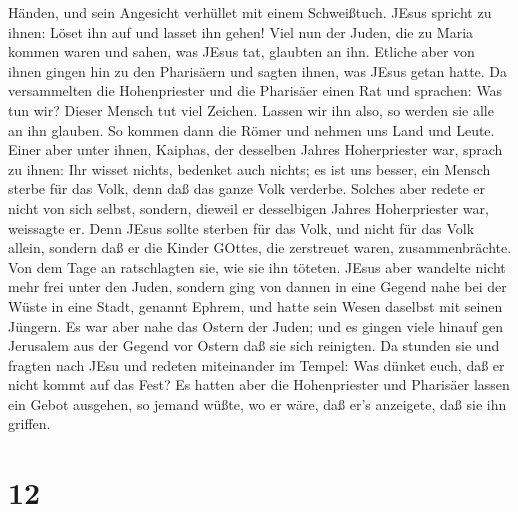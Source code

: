 Händen, und sein Angesicht verhüllet mit einem Schweißtuch. JEsus
spricht zu ihnen: Löset ihn auf und lasset ihn gehen!  Viel
nun der Juden, die zu Maria kommen waren und sahen, was JEsus tat,
glaubten an ihn.  Etliche aber von ihnen gingen hin zu den
Pharisäern und sagten ihnen, was JEsus getan hatte.  Da
versammelten die Hohenpriester und die Pharisäer einen Rat und sprachen:
Was tun wir? Dieser Mensch tut viel Zeichen.  Lassen wir
ihn also, so werden sie alle an ihn glauben. So kommen dann die Römer
und nehmen uns Land und Leute.  Einer aber unter ihnen,
Kaiphas, der desselben Jahres Hoherpriester war, sprach zu ihnen: Ihr
wisset nichts,  bedenket auch nichts; es ist uns besser,
ein Mensch sterbe für das Volk, denn daß das ganze Volk verderbe.
 Solches aber redete er nicht von sich selbst, sondern,
dieweil er desselbigen Jahres Hoherpriester war, weissagte er. Denn
JEsus sollte sterben für das Volk,  und nicht für das Volk
allein, sondern daß er die Kinder GOttes, die zerstreuet waren,
zusammenbrächte.  Von dem Tage an ratschlagten sie, wie sie
ihn töteten.  JEsus aber wandelte nicht mehr frei unter den
Juden, sondern ging von dannen in eine Gegend nahe bei der Wüste in eine
Stadt, genannt Ephrem, und hatte sein Wesen daselbst mit seinen Jüngern.
 Es war aber nahe das Ostern der Juden; und es gingen viele
hinauf gen Jerusalem aus der Gegend vor Ostern daß sie sich reinigten.
 Da stunden sie und fragten nach JEsu und redeten
miteinander im Tempel: Was dünket euch, daß er nicht kommt auf das Fest?
 Es hatten aber die Hohenpriester und Pharisäer lassen ein
Gebot ausgehen, so jemand wüßte, wo er wäre, daß er's anzeigete, daß sie
ihn griffen.

\hypertarget{section-11}{%
\section{12}\label{section-11}}


